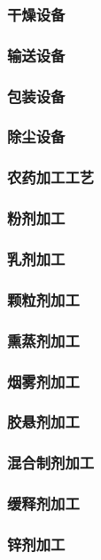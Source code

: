 \documentclass[UTF8]{../../ApplicationUniverse}
\begin{document}
            \subsubsection{干燥设备}
            \subsubsection{输送设备}
            \subsubsection{包装设备}
            \subsubsection{除尘设备}
    \subsubsection{农药加工工艺}
        \subsubsection{粉剂加工}
        \subsubsection{乳剂加工}
        \subsubsection{颗粒剂加工}
        \subsubsection{熏蒸剂加工}
        \subsubsection{烟雾剂加工}
        \subsubsection{胶悬剂加工}
        \subsubsection{混合制剂加工}
        \subsubsection{缓释剂加工}
            \subsubsection{锌剂加工}
\end{document}
